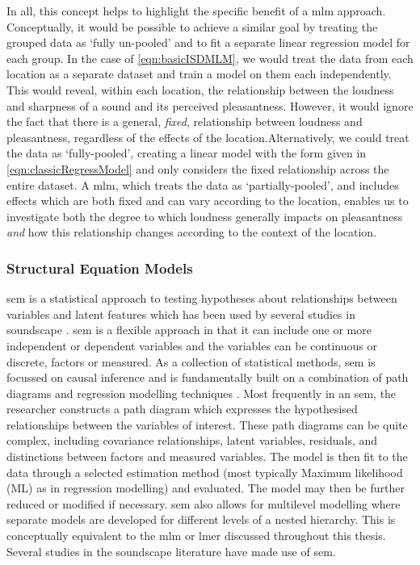 In all, this concept helps to highlight the specific benefit of a \gls{mlm} approach. Conceptually, it would be possible to achieve a similar goal by treating the grouped data as `fully un-pooled' and to fit a separate linear regression model for each group. In the case of \cref{eqn:basicISDMLM}, we would treat the data from each location as a separate dataset and train a model on them each independently. This would reveal, within each location, the relationship between the loudness and sharpness of a sound and its perceived pleasantness. However, it would ignore the fact that there is a general, \emph{fixed}, relationship between loudness and pleasantness, regardless of the effects of the location.Alternatively, we could treat the data as `fully-pooled', creating a linear model with the form given in \cref{eqn:classicRegressModel} and only considers the fixed relationship across the entire dataset. A \gls{mlm}, which treats the data as `partially-pooled', and includes effects which are both fixed and can vary according to the location, enables us to investigate both the degree to which loudness generally impacts on pleasantness \emph{and} how this relationship changes according to the context of the location. 

\subsubsection{Structural Equation Models}

\gls{sem} is a statistical approach to testing hypotheses about relationships between variables and latent features which has been used by several studies in soundscape \citep{Tarlao2020Investigating,Hong2015Influence,Torresin2022Indoor}. \gls{sem} is a flexible approach in that it can include one or more independent or dependent variables and the variables can be continuous or discrete, factors or measured. As a collection of statistical methods, \gls{sem} is focussed on causal inference and is fundamentally built on a combination of path diagrams and regression modelling techniques \citep{Ullman2012Structural}. Most frequently in an \gls{sem}, the researcher constructs a path diagram which expresses the hypothesised relationships between the variables of interest. These path diagrams can be quite complex, including covariance relationships, latent variables, residuals, and distinctions between factors and measured variables. The model is then fit to the data through a selected estimation method (most typically Maximum likelihood (ML) as in regression modelling) and evaluated. The model may then be further reduced or modified if necessary. \gls{sem} also allows for multilevel modelling where separate models are developed for different levels of a nested hierarchy. This is conceptually equivalent to the \gls{mlm} or \gls{lmer} discussed throughout this thesis. Several studies in the soundscape literature have made use of \gls{sem}. 


